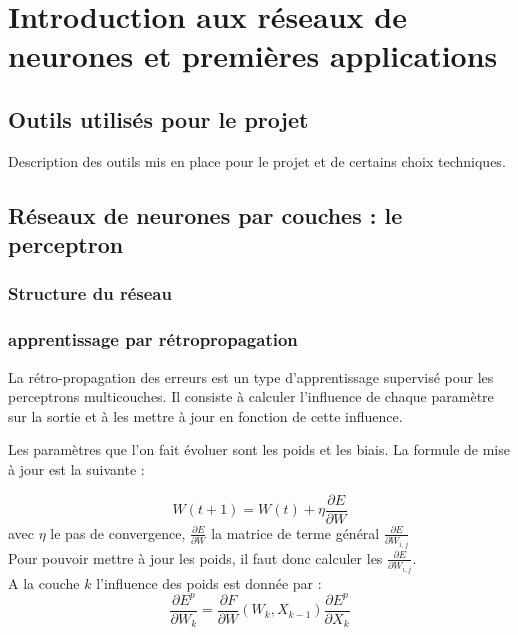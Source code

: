 


\chapter{Introduction aux réseaux de neurones et premières applications}

\section{Outils utilisés pour le projet}

Description des outils mis en place pour le projet et de certains choix techniques.

\section{Réseaux de neurones par couches : le perceptron}

\subsection{Structure du réseau}
\subsection{apprentissage par rétropropagation}


La rétro-propagation des erreurs est un type d’apprentissage supervisé pour les perceptrons multicouches. Il consiste à calculer l’influence de chaque paramètre sur la sortie et à les mettre à jour en fonction de cette influence.

Les paramètres que l’on fait évoluer sont les poids et les biais.
La formule de mise à jour est la suivante :

\[
W(t+1) = W(t) + \eta \frac{\partial E}{\partial W} 
\]
avec $\eta$ le pas de convergence, $\frac{\partial E}{\partial W} $ la matrice de terme général $\frac{\partial E}{\partial W_{i,j}} $\\
Pour pouvoir mettre à jour les poids, il faut donc calculer les $\frac{\partial E}{\partial W_{i,j}} $.\\
A la couche $k$ l'influence des poids est donnée par : 
\[
	\frac{\partial E^p}{\partial W _k} = \frac{\partial F}{\partial W}(W_k, X_{k-1})\frac{\partial E^p}{\partial X_k}
\]



